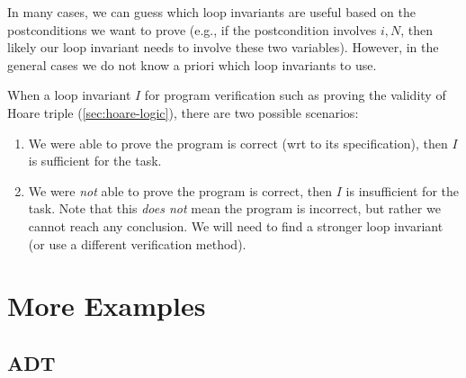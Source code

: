 \documentclass[oneside,11pt,dvipsnames]{book}
\begin{document}
In many cases, we can guess which loop invariants are useful based on
the postconditions we want to prove (e.g., if the postcondition involves $i, N$, then likely our loop invariant needs to involve these two variables). However, in the general cases we do not know a priori which loop invariants to use. 

When a loop invariant $I$ for program verification such as proving the validity of Hoare triple (\autoref{sec:hoare-logic}), there are two possible scenarios: 

\begin{enumerate}
\item We were able to prove the program is correct (wrt to its specification), then $I$ is sufficient for the task. 
\item We were \emph{not} able to prove the program is correct, then $I$ is insufficient for the task.  Note that this \emph{does not} mean the program is incorrect, but rather we cannot reach any conclusion. We will need to find a stronger loop invariant (or use a different verification method).
\end{enumerate}




\chapter{More Examples}
\section{ADT}
\end{document}
